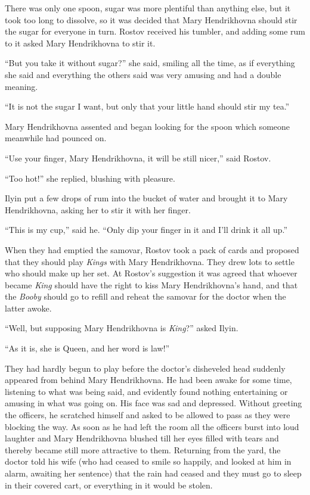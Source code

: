 There was only one spoon, sugar was more plentiful than anything
else, but it took too long to dissolve, so it was decided that
Mary Hendrikhovna should stir the sugar for everyone in
turn. Rostov received his tumbler, and adding some rum to it
asked Mary Hendrikhovna to stir it.

``But you take it without sugar?'' she said, smiling all the
time, as if everything she said and everything the others said
was very amusing and had a double meaning.

``It is not the sugar I want, but only that your little hand
should stir my tea.''

Mary Hendrikhovna assented and began looking for the spoon which
someone meanwhile had pounced on.

``Use your finger, Mary Hendrikhovna, it will be still nicer,''
said Rostov.

``Too hot!'' she replied, blushing with pleasure.

Ilyin put a few drops of rum into the bucket of water and brought
it to Mary Hendrikhovna, asking her to stir it with her finger.

``This is my cup,'' said he. ``Only dip your finger in it and
I'll drink it all up.''

When they had emptied the samovar, Rostov took a pack of cards
and proposed that they should play \emph{Kings} with Mary
Hendrikhovna. They drew lots to settle who should make up her
set. At Rostov's suggestion it was agreed that whoever became
\emph{King} should have the right to kiss Mary Hendrikhovna's hand,
and that the \emph{Booby} should go to refill and reheat the samovar
for the doctor when the latter awoke.

``Well, but supposing Mary Hendrikhovna is \emph{King}?'' asked Ilyin.

``As it is, she is Queen, and her word is law!''

They had hardly begun to play before the doctor's disheveled head
suddenly appeared from behind Mary Hendrikhovna. He had been
awake for some time, listening to what was being said, and
evidently found nothing entertaining or amusing in what was going
on. His face was sad and depressed. Without greeting the
officers, he scratched himself and asked to be allowed to pass as
they were blocking the way. As soon as he had left the room all
the officers burst into loud laughter and Mary Hendrikhovna
blushed till her eyes filled with tears and thereby became still
more attractive to them. Returning from the yard, the doctor told
his wife (who had ceased to smile so happily, and looked at him
in alarm, awaiting her sentence) that the rain had ceased and
they must go to sleep in their covered cart, or everything in it
would be stolen.

